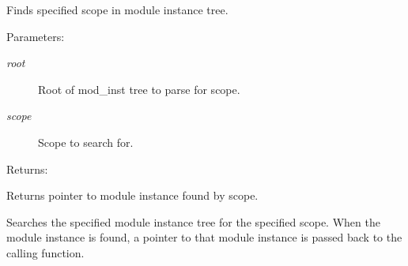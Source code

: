 Finds specified scope in module instance tree.

\begin{Desc}
\item[Parameters: ]\par
\begin{description}
\item[{\em 
root}]Root of mod\_\-inst tree to parse for scope. \item[{\em 
scope}]Scope to search for.\end{description}
\end{Desc}
\begin{Desc}
\item[Returns: ]\par
Returns pointer to module instance found by scope.\end{Desc}
Searches the specified module instance tree for the specified scope. When the module instance is found, a pointer to that module instance is passed back to the calling function. 
